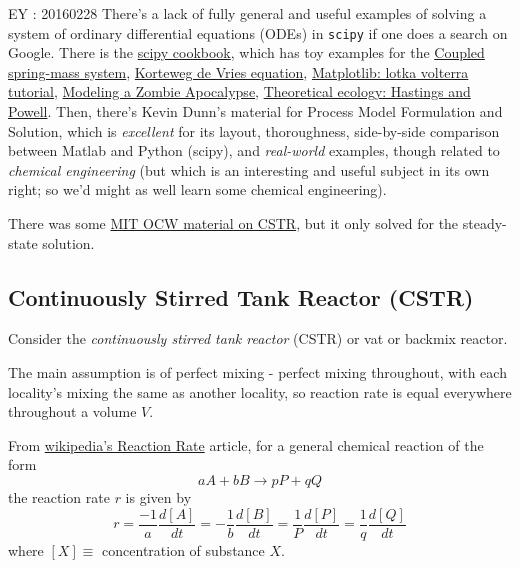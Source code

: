 \documentclass[10pt]{amsart}
\begin{document}
\begin{multicols*}{2}
EY : 20160228 There's a lack of fully general and useful examples of solving a system of ordinary differential equations (ODEs) in \verb|scipy| if one does a search on Google.  There is the \href{http://scipy-cookbook.readthedocs.org/items/numpy_scipy_ordinary_differential_equations.html}{scipy cookbook}, which has toy examples for the \href{http://scipy-cookbook.readthedocs.org/items/CoupledSpringMassSystem.html}{Coupled spring-mass system}, \href{http://scipy-cookbook.readthedocs.org/items/KdV.html}{Korteweg de Vries equation}, \href{http://scipy-cookbook.readthedocs.org/items/LoktaVolterraTutorial.html}{Matplotlib: lotka volterra tutorial}, \href{http://scipy-cookbook.readthedocs.org/items/Zombie_Apocalypse_ODEINT.html}{Modeling a Zombie Apocalypse}, \href{http://scipy-cookbook.readthedocs.org/items/Theoretical_Ecology_Hastings_and_Powell.html}{Theoretical ecology: Hastings and Powell}.  Then, there's Kevin Dunn's material for Process Model Formulation and Solution, which is \emph{excellent} for its layout, thoroughness, side-by-side comparison between Matlab and Python (scipy), and \emph{real-world} examples, though related to \emph{chemical engineering} (but which is an interesting and useful subject in its own right; so we'd might as well learn some chemical engineering).    

There was some \href{http://ocw.mit.edu/courses/chemical-engineering/10-37-chemical-and-biological-reaction-engineering-spring-2007/lecture-notes/lec05_02212007_g.pdf}{MIT OCW material on CSTR}, but it only solved for the steady-state solution.  

\subsection{Continuously Stirred Tank Reactor (CSTR)}

Consider the \emph{continuously stirred tank reactor} (CSTR) or vat or backmix reactor.  

The main assumption is of perfect mixing - perfect mixing throughout, with each locality's mixing the same as another locality, so reaction rate is equal everywhere throughout a volume $V$.  

From \href{https://en.wikipedia.org/wiki/Reaction_rate}{wikipedia's Reaction Rate} article, for a general chemical reaction of the form
\[
aA + bB \to pP + qQ
\]
the reaction rate $r$ is given by 
\[
r = \frac{-1}{a} \frac{d[A]}{dt} = - \frac{1}{b} \frac{d[B]}{dt} = \frac{1}{P} \frac{d[P]}{dt} = \frac{1}{q} \frac{d[Q]}{dt}
\]
where $[X] \equiv $ concentration of substance $X$.  


\end{multicols*}
\end{document}
